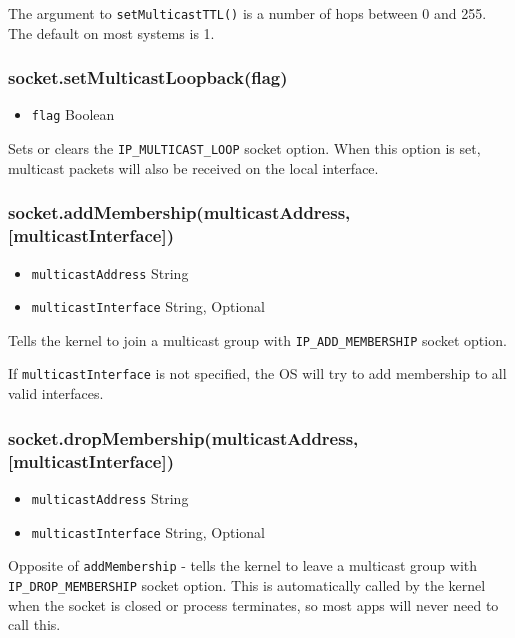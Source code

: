 The argument to \texttt{setMulticastTTL()} is a number of hops between 0
and 255. The default on most systems is 1.

\subsubsection{socket.setMulticastLoopback(flag)}

\begin{itemize}
\item
  \texttt{flag} Boolean
\end{itemize}

Sets or clears the \texttt{IP\_MULTICAST\_LOOP} socket option. When this
option is set, multicast packets will also be received on the local
interface.

\subsubsection{socket.addMembership(multicastAddress,
{[}multicastInterface{]})}

\begin{itemize}
\item
  \texttt{multicastAddress} String
\item
  \texttt{multicastInterface} String, Optional
\end{itemize}

Tells the kernel to join a multicast group with
\texttt{IP\_ADD\_MEMBERSHIP} socket option.

If \texttt{multicastInterface} is not specified, the OS will try to add
membership to all valid interfaces.

\subsubsection{socket.dropMembership(multicastAddress,
{[}multicastInterface{]})}

\begin{itemize}
\item
  \texttt{multicastAddress} String
\item
  \texttt{multicastInterface} String, Optional
\end{itemize}

Opposite of \texttt{addMembership} - tells the kernel to leave a
multicast group with \texttt{IP\_DROP\_MEMBERSHIP} socket option. This
is automatically called by the kernel when the socket is closed or
process terminates, so most apps will never need to call this.

